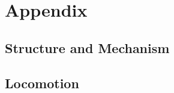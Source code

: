 %
%





\renewcommand\thesection{\Alph{section}}
\renewcommand\thefigure{\thesection.\arabic{figure}}
\renewcommand{\thetable}{\thesection.\arabic{table}}
\setcounter{figure}{0}
\setcounter{table}{0}
\setcounter{section}{0}

\chapter*{Appendix}

\label{chap:Appendix}

\section{Structure and Mechanism} \label{sec:AppendixStructureandMechanism}

\clearpage

\setcounter{figure}{0}
\setcounter{table}{0}

\section{Locomotion} 
\label{app:Loco}

